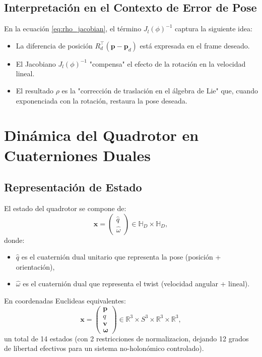\documentclass[11pt,a4paper]{article}
\begin{document}
\subsection{Interpretación en el Contexto de Error de Pose}

En la ecuación \eqref{eq:rho_jacobian}, el término $J_l(\phi)^{-1}$ captura la siguiente idea:
\begin{itemize}
    \item La diferencia de posición $R_d^\top (\mathbf{p} - \mathbf{p}_d)$ está expresada en el frame deseado.
    \item El Jacobiano $J_l(\phi)^{-1}$ "compensa" el efecto de la rotación en la velocidad lineal.
    \item El resultado $\rho$ es la "corrección de traslación en el álgebra de Lie" que, cuando exponenciada con la rotación, restaura la pose deseada.
\end{itemize}

\section{Dinámica del Quadrotor en Cuaterniones Duales}
\label{sec:uav_dynamics}

\subsection{Representación de Estado}

El estado del quadrotor se compone de:
\begin{equation}
    \mathbf{x} = \begin{pmatrix} \hat{q} \\ \hat{\omega} \end{pmatrix} \in \mathbb{H}_D \times \mathbb{H}_D,
\end{equation}
donde:
\begin{itemize}
    \item $\hat{q}$ es el cuaternión dual unitario que representa la pose (posición + orientación),
    \item $\hat{\omega}$ es el cuaternión dual que representa el twist (velocidad angular + lineal).
\end{itemize}

En coordenadas Euclideas equivalentes:
\begin{equation}
    \mathbf{x} = \begin{pmatrix} \mathbf{p} \\ q \\ \mathbf{v} \\ \boldsymbol{\omega} \end{pmatrix} \in \mathbb{R}^3 \times S^3 \times \mathbb{R}^3 \times \mathbb{R}^3,
\end{equation}
un total de 14 estados (con 2 restricciones de normalizacion, dejando 12 grados de libertad efectivos para un sistema no-holonómico controlado).
\end{document}
